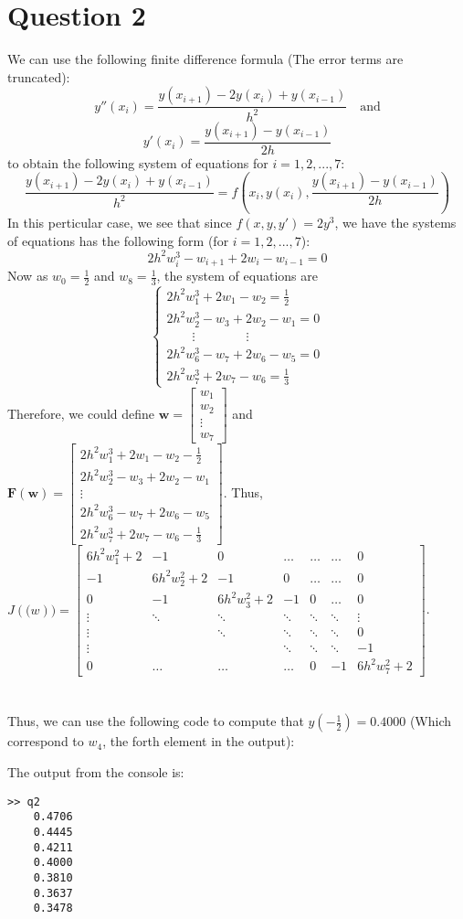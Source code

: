 \documentclass[11pt]{article}
\begin{document}
\section*{Question 2}
We can use the following finite difference formula (The error terms are truncated):
\[y''(x_i) = \frac{y(x_{i+1})-2y(x_i)+y(x_{i-1})}{h^2} \quad \text{and}\]
\[y'(x_i) = \frac{y(x_{i+1})-y(x_{i-1})}{2h}\]
to obtain the following system of equations for $i = 1,2,...,7$:
\[\frac{y(x_{i+1})-2y(x_i)+y(x_{i-1})}{h^2} = f\left(x_i, y(x_i), \frac{y(x_{i+1})-y(x_{i-1})}{2h}\right)\]
In this perticular case, we see that since $f(x,y,y') = 2y^3$, we have the systems of equations has the following form (for $i = 1,2,...,7$):
\[2h^2w_i^3 - w_{i+1} + 2w_i - w_{i-1} = 0\]
Now as $\displaystyle w_0 = \frac{1}{2}$ and $\displaystyle w_8 = \frac{1}{3}$, the system of equations are
\[\begin{cases}
2h^2w_1^3 + 2w_1 - w_2 = \frac{1}{2}\\
2h^2w_2^3 - w_{3} + 2w_2 - w_{1} = 0\\
\qquad \vdots \qquad \qquad \vdots\\
2h^2w_6^3 - w_{7} + 2w_6 - w_{5} = 0\\
2h^2w_7^3 + 2w_7 - w_{6} = \frac{1}{3}
\end{cases}\]
Therefore, we could define $\mathbf{w} = \begin{bmatrix}
w_1\\w_2\\ \vdots \\w_7
\end{bmatrix}$ and $ \mathbf{F}(\mathbf{w}) = \begin{bmatrix}
2h^2w_1^3 + 2w_1 - w_2 - \frac{1}{2}\\
2h^2w_2^3 - w_{3} + 2w_2 - w_{1}\\
\vdots \\
2h^2w_6^3 - w_{7} + 2w_6 - w_{5}\\
2h^2w_7^3 + 2w_7 - w_{6} - \frac{1}{3}
\end{bmatrix}$. Thus, $J(\mathbf(w)) = \begin{bmatrix}
6h^2w_1^2 + 2 & -1 & 0 & \dots & \dots & \dots & 0\\
-1 & 6h^2w_2^2 + 2 & -1 & 0 & \dots & \dots & 0\\
0 & -1 & 6h^2w_3^2 + 2 & -1 & 0 & \dots & 0\\
\vdots & \ddots & \ddots & \ddots & \ddots & \ddots & \vdots\\
\vdots & & \ddots & \ddots & \ddots & \ddots & 0\\
\vdots & & & \ddots & \ddots & \ddots & -1\\
0 & \dots & \dots & \dots & 0 & -1 & 6h^2w_7^2 + 2
\end{bmatrix}$.\hfill\\\\\\
Thus, we can use the following code to compute that $\displaystyle y\left(-\frac{1}{2}\right) = 0.4000$ (Which correspond to $w_4$, the forth element in the output):

The output from the console is:
\begin{verbatim}
>> q2
    0.4706
    0.4445
    0.4211
    0.4000
    0.3810
    0.3637
    0.3478
\end{verbatim}
\end{document}
